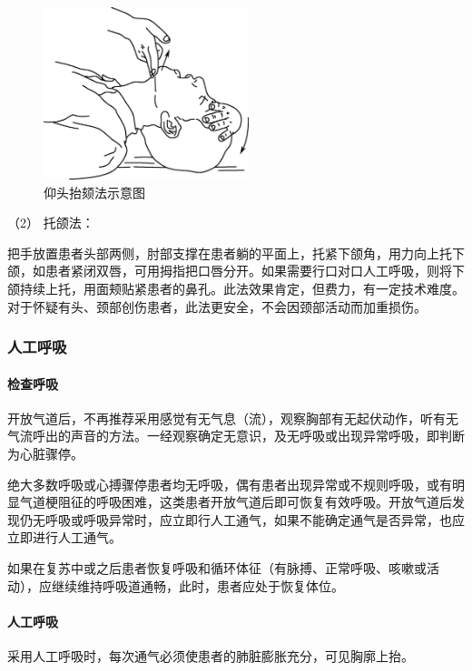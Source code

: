 \begin{figure}[!htbp]
 \centering
 \includegraphics[width=2.35417in,height=1.97917in]{./images/Image00406.jpg}
 \captionsetup{justification=centering}
 \caption{仰头抬颏法示意图}
 \label{fig101-3}
  \end{figure} 

\hypertarget{text00283.htmlux5cux23CHP10-1-4-2-3-2}{}
（2） 托颌法：

把手放置患者头部两侧，肘部支撑在患者躺的平面上，托紧下颌角，用力向上托下颌，如患者紧闭双唇，可用拇指把口唇分开。如果需要行口对口人工呼吸，则将下颌持续上托，用面颊贴紧患者的鼻孔。此法效果肯定，但费力，有一定技术难度。对于怀疑有头、颈部创伤患者，此法更安全，不会因颈部活动而加重损伤。

\subsubsection{人工呼吸}

\paragraph{检查呼吸}

开放气道后，不再推荐采用感觉有无气息（流），观察胸部有无起伏动作，听有无气流呼出的声音的方法。一经观察确定无意识，及无呼吸或出现异常呼吸，即判断为心脏骤停。

绝大多数呼吸或心搏骤停患者均无呼吸，偶有患者出现异常或不规则呼吸，或有明显气道梗阻征的呼吸困难，这类患者开放气道后即可恢复有效呼吸。开放气道后发现仍无呼吸或呼吸异常时，应立即行人工通气，如果不能确定通气是否异常，也应立即进行人工通气。

如果在复苏中或之后患者恢复呼吸和循环体征（有脉搏、正常呼吸、咳嗽或活动），应继续维持呼吸道通畅，此时，患者应处于恢复体位。

\paragraph{人工呼吸}

采用人工呼吸时，每次通气必须使患者的肺脏膨胀充分，可见胸廓上抬。

